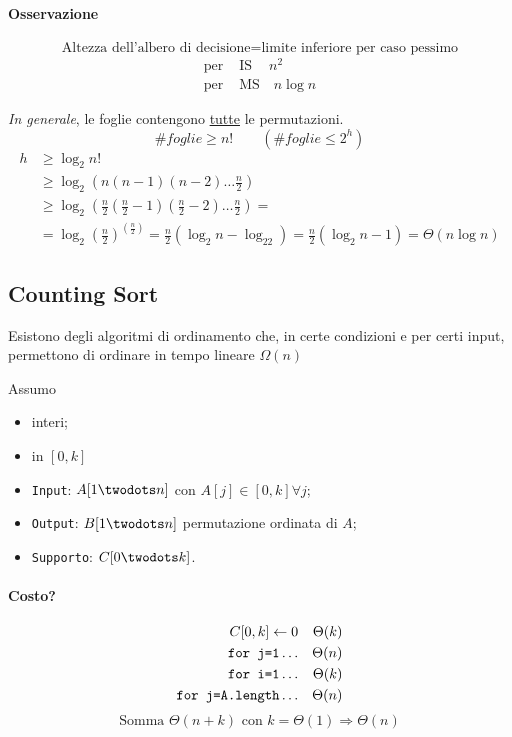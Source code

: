 \paragraph{Osservazione} 
$$ \text{Altezza dell'albero di decisione} = \text{limite inferiore per caso pessimo}$$
\begin{align*}
    \text{per }& \text{IS} \ \quad n^2 \\
    \text{per }& \text{MS} \quad n \log n
\end{align*}

\emph{In generale}, le foglie contengono \underline{tutte} le permutazioni.
$$\# foglie \geq n! \qquad (\# foglie \leq 2^h)$$
\begin{align*}
    h & \geq \log_2 n! \\
    & \geq \log_2 \left( n(n-1)(n-2) \dots \frac{n}{2}\right) \\
    & \geq \log_2 \left( \frac{n}{2}\left(\frac{n}{2}-1\right)\left(\frac{n}{2}-2\right) \dots \frac{n}{2}\right) = \\
    & = \log_2 \left( \frac{n}{2} \right)^{(\frac{n}{2})} 
        = \frac{n}{2} \left( \log_2 n - \log_22\right)
        = \frac{n}{2} (\log_2 n - 1) = \Theta (n \log n)
\end{align*}

\subsection{Counting Sort}
Esistono degli algoritmi di ordinamento che, in certe condizioni e per certi input, permettono
di ordinare in tempo lineare $\Omega (n)$

Assumo
\begin{itemize}[label=$-$]
    \item interi;
    \item in $[0,k]$
\end{itemize}

\begin{itemize}[label=]
    \item \texttt{Input}: $A[1\twodots n]$ con $A[j] \in [0,k] \forall j$;
    \item \texttt{Output}: $B[1\twodots n]$ permutazione ordinata di $A$;
    \item \texttt{Supporto}: $C[0\twodots k]$.
\end{itemize}

 

\paragraph{Costo?} 
\begin{align*}
    C[0,k] \leftarrow 0 && \Theta(k) \\
    \text{\texttt{for j=1}} \dots && \Theta(n) \\
    \text{\texttt{for i=1}} \dots && \Theta(k) \\
    \text{\texttt{for j=A.length}} \dots && \Theta(n)
\end{align*}
$$\text{Somma } \Theta(n+k) \text{ con } k = \Theta(1) \Rightarrow \Theta(n)$$

